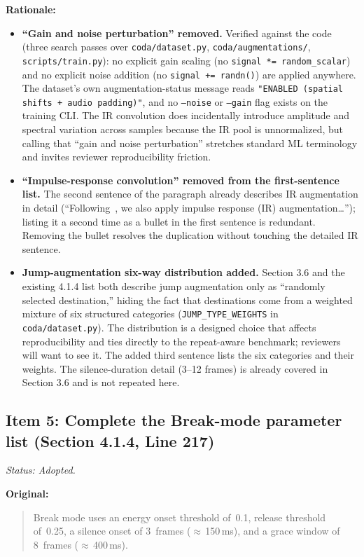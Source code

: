 \documentclass{article}
\begin{document}
\textbf{Rationale:}
\begin{itemize}
    \item \textbf{``Gain and noise perturbation'' removed.} Verified against the code (three search passes over \texttt{coda/dataset.py}, \texttt{coda/augmentations/}, \texttt{scripts/train.py}): no explicit gain scaling (no \texttt{signal *= random\_scalar}) and no explicit noise addition (no \texttt{signal += randn()}) are applied anywhere. The dataset's own augmentation-status message reads \texttt{"ENABLED (spatial shifts + audio padding)"}, and no \texttt{--noise} or \texttt{--gain} flag exists on the training CLI. The IR convolution does incidentally introduce amplitude and spectral variation across samples because the IR pool is unnormalized, but calling that ``gain and noise perturbation'' stretches standard ML terminology and invites reviewer reproducibility friction.
    \item \textbf{``Impulse-response convolution'' removed from the first-sentence list.} The second sentence of the paragraph already describes IR augmentation in detail (``Following~\cite{henkel2021real}, we also apply impulse response (IR) augmentation\ldots''); listing it a second time as a bullet in the first sentence is redundant. Removing the bullet resolves the duplication without touching the detailed IR sentence.
    \item \textbf{Jump-augmentation six-way distribution added.} Section 3.6 and the existing 4.1.4 list both describe jump augmentation only as ``randomly selected destination,'' hiding the fact that destinations come from a weighted mixture of six structured categories (\texttt{JUMP\_TYPE\_WEIGHTS} in \texttt{coda/dataset.py}). The distribution is a designed choice that affects reproducibility and ties directly to the repeat-aware benchmark; reviewers will want to see it. The added third sentence lists the six categories and their weights. The silence-duration detail (3--12 frames) is already covered in Section 3.6 and is not repeated here.
\end{itemize}

\subsection*{Item 5: Complete the Break-mode parameter list (Section 4.1.4, Line 217)}

\textit{Status: Adopted.}

\textbf{Original:}
\begin{quote}
Break mode uses an energy onset threshold of~0.1, release threshold of~0.25, a silence onset of 3~frames ($\approx$\,150\,ms), and a grace window of 8~frames ($\approx$\,400\,ms).
\end{quote}
\end{document}
